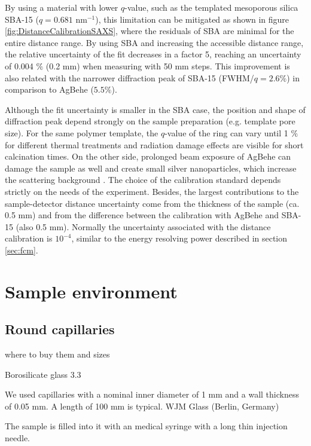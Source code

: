 By using a material with lower $q$-value, such as the templated mesoporous silica SBA-15 \citep{zhao_triblock_1998} ($q=0.681$ nm$^{-1}$), this limitation can be mitigated as shown in figure \ref{fig:DistanceCalibrationSAXS}, where the residuals of SBA are minimal for the entire distance range. By using SBA and increasing the accessible distance range, the relative uncertainty of the fit decreases in a factor 5, reaching an uncertainty of 0.004 $\%$ (0.2 mm) when measuring with 50 mm steps. This improvement is also related with the narrower diffraction peak of SBA-15 (FWHM/$q=2.6\%$) in comparison to AgBehe ($5.5\%$).

Although the fit uncertainty is smaller in the SBA case, the position and shape of diffraction peak depend strongly on the sample preparation (e.g. template pore size). For the same polymer template, the $q$-value of the ring can vary until 1 $\%$ for different thermal treatments and radiation damage effects are visible for short calcination times. On the other side, prolonged beam exposure of AgBehe can damage the sample as well and create small silver nanoparticles, which increase the scattering background \cite{liu_thermal_2006}. The choice of the calibration standard depends strictly on the needs of the experiment. Besides, the largest contributions to the sample-detector distance uncertainty come from the thickness of the sample (ca. 0.5 mm) and from the difference between the calibration with AgBehe and SBA-15 (also 0.5 mm). Normally the uncertainty associated with the distance calibration is $10^{-4}$, similar to the energy resolving power described in section \ref{sec:fcm}.

\newpage

\section{Sample environment}

\subsection{Round capillaries}

where to buy them and sizes

Borosilicate glass 3.3

We used capillaries with a nominal inner diameter of 1 mm and a wall thickness of 0.05 mm. A length of 100 mm is typical. WJM Glass (Berlin, Germany)

The sample is filled into it with an medical syringe with a long thin injection needle. 


